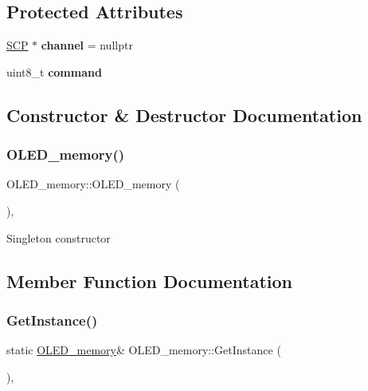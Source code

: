 \subsection*{Protected Attributes}
\begin{DoxyCompactItemize}
\item 
\hypertarget{class_o_l_e_d__memory_afa9e07e6d56995ba0f2c38205e848cd9}{}\label{class_o_l_e_d__memory_afa9e07e6d56995ba0f2c38205e848cd9} 
\hyperlink{class_s_c_p}{S\+CP} $\ast$ {\bfseries channel} = nullptr
\item 
\hypertarget{class_o_l_e_d__memory_ae6b8672f7cb275a40219a2f0834fb4f9}{}\label{class_o_l_e_d__memory_ae6b8672f7cb275a40219a2f0834fb4f9} 
uint8\+\_\+t {\bfseries command}
\end{DoxyCompactItemize}


\subsection{Constructor \& Destructor Documentation}
\hypertarget{class_o_l_e_d__memory_a237da57c485eed1ba23a9752035f3973}{}\label{class_o_l_e_d__memory_a237da57c485eed1ba23a9752035f3973} 
\subsubsection{\texorpdfstring{O\+L\+E\+D\+\_\+memory()}{OLED\_memory()}}
{\footnotesize\ttfamily O\+L\+E\+D\+\_\+memory\+::\+O\+L\+E\+D\+\_\+memory (\begin{DoxyParamCaption}{ }\end{DoxyParamCaption})\hspace{0.3cm}{\ttfamily [inline]}, {\ttfamily [protected]}}

Singleton constructor 

\subsection{Member Function Documentation}
\hypertarget{class_o_l_e_d__memory_a8d20efdd852c066b46950bc7b98ff368}{}\label{class_o_l_e_d__memory_a8d20efdd852c066b46950bc7b98ff368} 
\subsubsection{\texorpdfstring{Get\+Instance()}{GetInstance()}}
{\footnotesize\ttfamily static \hyperlink{class_o_l_e_d__memory}{O\+L\+E\+D\+\_\+memory}\& O\+L\+E\+D\+\_\+memory\+::\+Get\+Instance (\begin{DoxyParamCaption}{ }\end{DoxyParamCaption})\hspace{0.3cm}{\ttfamily [inline]}, {\ttfamily [static]}}

